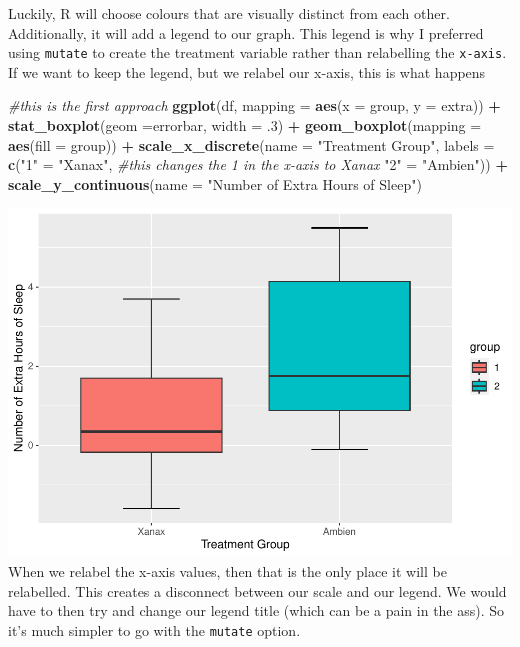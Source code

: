 \documentclass[
]{book}
\newenvironment{Shaded}{\begin{snugshade}}{\end{snugshade}}
\newcommand{\AttributeTok}[1]{\textcolor[rgb]{0.13,0.29,0.53}{#1}}
\newcommand{\CommentTok}[1]{\textcolor[rgb]{0.56,0.35,0.01}{\textit{#1}}}
\newcommand{\DecValTok}[1]{\textcolor[rgb]{0.00,0.00,0.81}{#1}}
\newcommand{\FunctionTok}[1]{\textcolor[rgb]{0.13,0.29,0.53}{\textbf{#1}}}
\newcommand{\NormalTok}[1]{#1}
\newcommand{\OtherTok}[1]{\textcolor[rgb]{0.56,0.35,0.01}{#1}}
\newcommand{\SpecialCharTok}[1]{\textcolor[rgb]{0.81,0.36,0.00}{\textbf{#1}}}
\newcommand{\StringTok}[1]{\textcolor[rgb]{0.31,0.60,0.02}{#1}}
\begin{document}
Luckily, R will choose colours that are visually distinct from each other. Additionally, it will add a legend to our graph. This legend is why I preferred using \texttt{mutate} to create the treatment variable rather than relabelling the \texttt{x-axis}. If we want to keep the legend, but we relabel our x-axis, this is what happens

\begin{Shaded}
\begin{Highlighting}[]
\CommentTok{\#this is the first approach}
\FunctionTok{ggplot}\NormalTok{(df, }\AttributeTok{mapping =} \FunctionTok{aes}\NormalTok{(}\AttributeTok{x =}\NormalTok{ group, }\AttributeTok{y =}\NormalTok{ extra)) }\SpecialCharTok{+}
  \FunctionTok{stat\_boxplot}\NormalTok{(}\AttributeTok{geom =}\StringTok{\textquotesingle{}errorbar\textquotesingle{}}\NormalTok{, }\AttributeTok{width =}\NormalTok{ .}\DecValTok{3}\NormalTok{) }\SpecialCharTok{+}
  \FunctionTok{geom\_boxplot}\NormalTok{(}\AttributeTok{mapping =} \FunctionTok{aes}\NormalTok{(}\AttributeTok{fill =}\NormalTok{ group)) }\SpecialCharTok{+} 
  \FunctionTok{scale\_x\_discrete}\NormalTok{(}\AttributeTok{name =} \StringTok{"Treatment Group"}\NormalTok{,}
                   \AttributeTok{labels =} \FunctionTok{c}\NormalTok{(}\StringTok{"1"}  \OtherTok{=} \StringTok{"Xanax"}\NormalTok{, }\CommentTok{\#this changes the 1 in the x{-}axis to Xanax}
                              \StringTok{"2"} \OtherTok{=} \StringTok{"Ambien"}\NormalTok{)) }\SpecialCharTok{+} 
  \FunctionTok{scale\_y\_continuous}\NormalTok{(}\AttributeTok{name =} \StringTok{"Number of Extra Hours of Sleep"}\NormalTok{)}
\end{Highlighting}
\end{Shaded}

\includegraphics{rintro_demo_files/figure-latex/unnamed-chunk-296-1.pdf}
When we relabel the x-axis values, then that is the only place it will be relabelled. This creates a disconnect between our scale and our legend. We would have to then try and change our legend title (which can be a pain in the ass). So it's much simpler to go with the \texttt{mutate} option.
\end{document}
